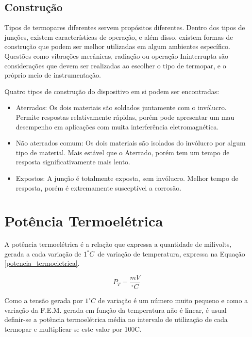 \documentclass[a4paper,12pt]{report}
\begin{document}
	\subsection{Construção}
	
	Tipos de termopares diferentes servem propósitos diferentes. Dentro dos tipos de junções, existem características de operação, e além disso, existem formas de construção que podem ser melhor utilizadas em algum ambientes específico. Questões como vibrações mecânicas, radiação ou operação Ininterrupta são considerações que devem ser realizadas ao escolher o tipo de termopar, e o próprio meio de instrumentação.
	
	Quatro tipos de construção do dispositivo em si podem ser encontradas:
	
	\begin{itemize}
		\item Aterrados: Os dois materiais são soldados juntamente com o invólucro. Permite respostas relativamente rápidas, porém pode apresentar um mau desempenho em aplicações com muita interferência eletromagnética.
		
		\item Não aterrados comum: Os dois materiais são isolados do invólucro por algum tipo de material. Mais estável que o Aterrado, porém tem um tempo de resposta significativamente mais lento.
		
		\item Expostos: A junção é totalmente exposta, sem invólucro. Melhor tempo de resposta, porém é extremamente susceptível a corrosão.
	\end{itemize}
	
	\section{Potência Termoelétrica}

	A potência termoelétrica é a relação que expressa a quantidade de milivolts, gerada a cada variação de $1^\degree C$ de variação de temperatura, expressa na Equação \ref{potencia_termoeletrica}.
	
	\begin{equation}
		P_{T} = \frac{mV}{^{\circ}C}
		\label{potencia_termoeletrica}
	\end{equation}

	\singlespacing

	Como a tensão gerada por $1^{\circ}C$ de variação é um número muito pequeno e como a variação da F.E.M. gerada em função da temperatura não é linear, é usual definir-se a potência termoelétrica média no intervalo de utilização de cada termopar e multiplicar-se este valor por 100\degree C.
\end{document}
